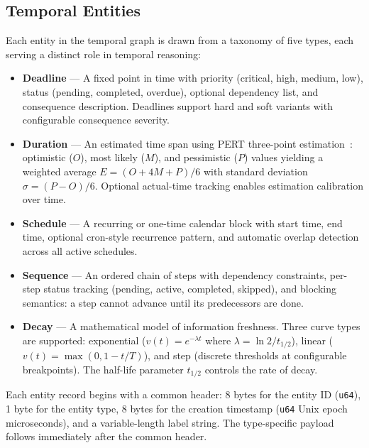 \documentclass[10pt, twocolumn]{article}
\begin{document}
\subsection{Temporal Entities}
\label{sec:entities}

Each entity in the temporal graph is drawn from a taxonomy of five types, each serving a distinct role in temporal reasoning:

\begin{itemize}[nosep, leftmargin=*]
  \item \textbf{Deadline} --- A fixed point in time with priority (critical, high, medium, low), status (pending, completed, overdue), optional dependency list, and consequence description. Deadlines support hard and soft variants with configurable consequence severity.
  \item \textbf{Duration} --- An estimated time span using PERT three-point estimation~\cite{pert1959}: optimistic ($O$), most likely ($M$), and pessimistic ($P$) values yielding a weighted average $E = (O + 4M + P) / 6$ with standard deviation $\sigma = (P - O) / 6$. Optional actual-time tracking enables estimation calibration over time.
  \item \textbf{Schedule} --- A recurring or one-time calendar block with start time, end time, optional cron-style recurrence pattern, and automatic overlap detection across all active schedules.
  \item \textbf{Sequence} --- An ordered chain of steps with dependency constraints, per-step status tracking (pending, active, completed, skipped), and blocking semantics: a step cannot advance until its predecessors are done.
  \item \textbf{Decay} --- A mathematical model of information freshness. Three curve types are supported: exponential ($v(t) = e^{-\lambda t}$ where $\lambda = \ln 2 / t_{1/2}$), linear ($v(t) = \max(0, 1 - t/T)$), and step (discrete thresholds at configurable breakpoints). The half-life parameter $t_{1/2}$ controls the rate of decay.
\end{itemize}

Each entity record begins with a common header: 8 bytes for the entity ID (\texttt{u64}), 1 byte for the entity type, 8 bytes for the creation timestamp (\texttt{u64} Unix epoch microseconds), and a variable-length label string. The type-specific payload follows immediately after the common header.
\end{document}
